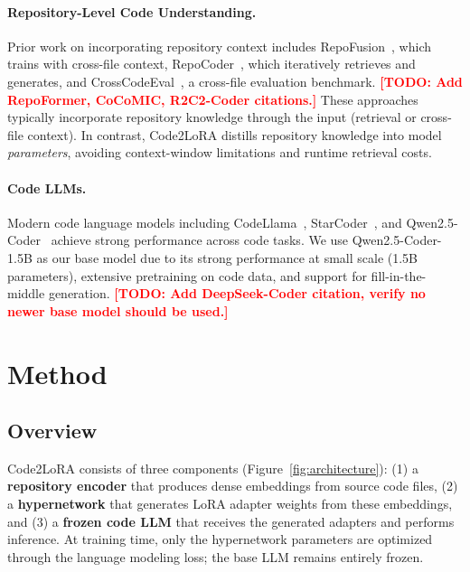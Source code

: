 \documentclass[11pt]{article}
\newcommand{\method}{Code2LoRA}
\newcommand{\todo}[1]{\textcolor{red}{\textbf{[TODO: #1]}}}
\begin{document}
\paragraph{Repository-Level Code Understanding.}
Prior work on incorporating repository context includes RepoFusion~\cite{shrivastava2023repofusion}, which trains with cross-file context, RepoCoder~\cite{zhang2023repocoder}, which iteratively retrieves and generates, and CrossCodeEval~\cite{ding2024crosscodeeval}, a cross-file evaluation benchmark.
\todo{Add RepoFormer, CoCoMIC, R2C2-Coder citations.}
These approaches typically incorporate repository knowledge through the input (retrieval or cross-file context).
In contrast, \method{} distills repository knowledge into model \emph{parameters}, avoiding context-window limitations and runtime retrieval costs.

\paragraph{Code LLMs.}
Modern code language models including CodeLlama~\cite{roziere2023code}, StarCoder~\cite{li2023starcoder}, and Qwen2.5-Coder~\cite{hui2024qwen25coder} achieve strong performance across code tasks.
We use Qwen2.5-Coder-1.5B as our base model due to its strong performance at small scale (1.5B parameters), extensive pretraining on code data, and support for fill-in-the-middle generation.
\todo{Add DeepSeek-Coder citation, verify no newer base model should be used.}

\section{Method}
\label{sec:method}

\subsection{Overview}

\method{} consists of three components (Figure~\ref{fig:architecture}):
(1) a \textbf{repository encoder} that produces dense embeddings from source code files,
(2) a \textbf{hypernetwork} that generates LoRA adapter weights from these embeddings, and
(3) a \textbf{frozen code LLM} that receives the generated adapters and performs inference.
At training time, only the hypernetwork parameters are optimized through the language modeling loss; the base LLM remains entirely frozen.
\end{document}

